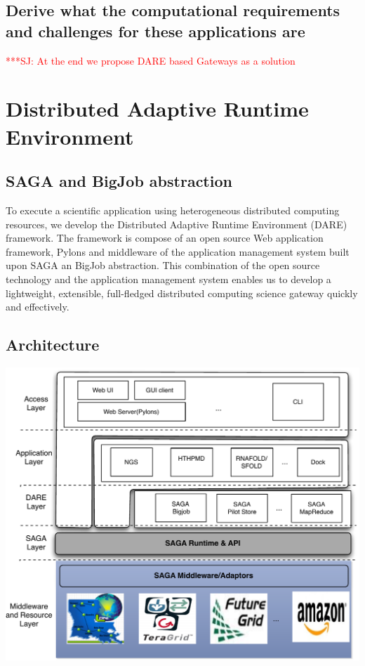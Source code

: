 \documentclass[12pt]{article}
\newcommand{\jhanote}[1]{ {\textcolor{red}     {***SJ: #1}}}
\newcommand{\jhanote}[1]{}
\begin{document}
\subsection{Derive what the computational requirements and challenges
  for these applications are}


\jhanote{At the end we propose DARE based Gateways as a solution}


\section{Distributed Adaptive Runtime Environment}

\subsection{SAGA and BigJob abstraction}

To execute a scientific application using heterogeneous distributed computing resources, we develop the Distributed Adaptive Runtime Environment (DARE) framework\cite{dareurl}.  The framework is compose of an open source Web application framework, Pylons
and middleware of the application management system built upon SAGA an BigJob abstraction\cite{saga-ccgrid10,saga-royalsoc,saga-web,jha2009developing,ecmls10}.  This combination of the open source technology and the application management system enables us to develop a lightweight, extensible, full-fledged distributed computing science gateway quickly and effectively\cite{pylonsurl}. 

\subsection{Architecture}

\includegraphics[scale=0.70]{figures/DAREOutline.pdf}
\end{document}
